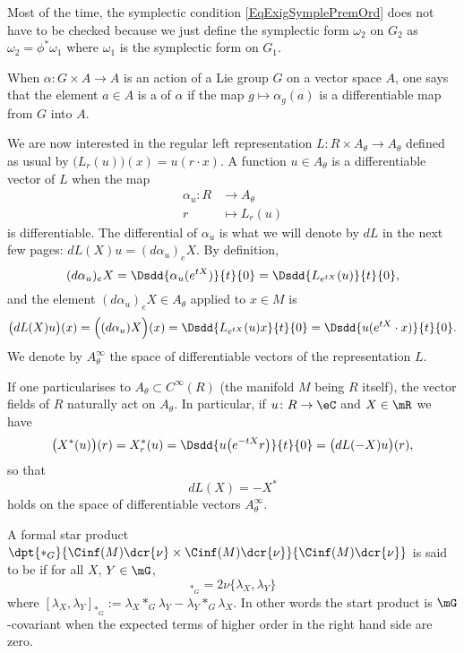 \begin{remark}
Most of the time, the symplectic condition \eqref{EqExigSymplePremOrd} does not have to be checked because we just define the symplectic form $\omega_2$ on $G_2$ as $\omega_2=\phi^*\omega_1$ where $\omega_1$ is the symplectic form on $G_1$.
\end{remark}

\begin{definition}
When $\alpha\colon G\times A\to A$ is an action of a Lie group $G$ on a vector space $A$, one says that the element $a\in A$ is a  of $\alpha$ if the map $g\mapsto\alpha_g(a)$ is a differentiable map from $G$ into $A$.
\end{definition}

We are now interested in the regular left representation $L\colon R\times A_{\theta}\to  A_{\theta}$ defined as usual by $\big( L_r(u) \big)(x)=u(r\cdot x)$. A function $u\in A_{\theta}$ is a differentiable vector of $L$ when the map
\begin{equation}
\begin{aligned}
 \alpha_u\colon R&\to  A_{\theta} \\
r&\mapsto L_r(u)
\end{aligned}
\end{equation}
is differentiable. The differential of $\alpha_u$ is what we will denote by $dL$ in the next few pages: $dL(X)u=(d\alpha_u)_eX$. By definition,
\[
  (d\alpha_u)_eX=\Dsdd{ \alpha_u( e^{tX}) }{t}{0}=\Dsdd{ L_{ e^{tX}}(u) }{t}{0},
\]
and the element $(d\alpha_u)_eX\in A_{\theta}$ applied to $x\in M$ is
\begin{equation}
 \big( dL(X)u \big)(x) =\Big( (d\alpha_u)X \Big)(x)=\Dsdd{ L_{ e^{tX}}(u)x }{t}{0}=\Dsdd{ u( e^{tX}\cdot x) }{t}{0}.
\end{equation}
We denote by $ A_{\theta}^{\infty}$ the space of differentiable vectors of the representation $L$.

If one particularises to  $ A_{\theta}\subset  C^{\infty}(R)$ (the manifold $M$ being $R$ itself), the vector fields of $R$ naturally act on $ A_{\theta}$. In particular, if $u\colon R\to \eC$ and $X\in \mR$ we have
\[
  \big( X^*(u) \big)(r)=X^*_r(u)=\Dsdd{ u\big(  e^{-tX}r \big) }{t}{0}=\big( dL(-X)u \big)(r),
\]
so that
\begin{equation}
   dL(X)=-X^*
\end{equation}
holds on the space of differentiable vectors $ A_{\theta}^{\infty}$.

\begin{definition}
A formal star product $\dpt{\ast_G}{\Cinf(M)\dcr{\nu}\times \Cinf(M)\dcr{\nu}}{\Cinf(M)\dcr{\nu}}$ is said to be  if for all $X$, $Y\in\mG$,
\begin{equation}
[\lambda_X,\lambda_Y]_{\ast_G}=2\nu\{\lambda_X,\lambda_Y\}
\end{equation}
where $[\lambda_{X},\lambda_{Y}]_{\ast_{G}}:=\lambda_X\ast_G\lambda_Y-\lambda_Y\ast_G\lambda_X$. In other words the start product is $\mG$-covariant when the expected terms of higher order in the right hand side are zero.
\end{definition}

